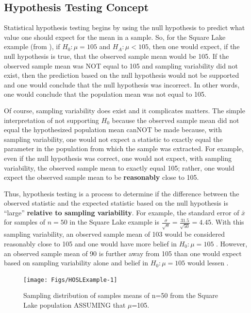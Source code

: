 \documentclass[10pt,openany]{book}\usepackage[]{graphicx}\usepackage[]{color}
\newenvironment{knitrout}{}{} %
\begin{document}
\subsection{Hypothesis Testing Concept}
\vspace{-6pt}
Statistical hypothesis testing begins by using the null hypothesis to predict what value one should expect for the mean in a sample. So, for the Square Lake example (from ), if $H_{0}:\mu=105$ and $H_{A}:\mu<105$, then one would expect, if the null hypothesis is true, that the observed sample mean would be 105. If the observed sample mean was NOT equal to 105 and sampling variability did not exist, then the prediction based on the null hypothesis would not be supported and one would conclude that the null hypothesis was incorrect. In other words, one would conclude that the population mean was not equal to 105.

Of course, sampling variability does exist and it complicates matters. The simple interpretation of not supporting $H_{0}$ because the observed sample mean did not equal the hypothesized population mean canNOT be made because, with sampling variability, one would not expect a statistic to exactly equal the parameter in the population from which the sample was extracted. For example, even if the null hypothesis was correct, one would not expect, with sampling variability, the observed sample mean to exactly equal 105; rather, one would expect the observed sample mean to be \textbf{reasonably} close to 105.

Thus, hypothesis testing is a process to determine if the difference between the observed statistic and the expected statistic based on the null hypothesis is ``large'' \textbf{relative to sampling variability}. For example, the standard error of $\bar{x}$ for samples of $n=50$ in the Square Lake example is $\frac{\sigma}{\sqrt{n}}=$$\frac{31.5}{\sqrt{50}}$$=4.45$. With this sampling variability, an observed sample mean of 103 would be considered reasonably close to 105 and one would have more belief in $H_{0}:\mu=105$ . However, an observed sample mean of 90 is further away from 105 than one would expect based on sampling variability alone and belief in $H_{0}:\mu=105$ would lessen .

\begin{knitrout}
\color{fgcolor}\begin{figure}[hbtp]

{\centering \texttt{[image: Figs/HOSLExample-1]} 

}

\caption[Sampling distribution of samples means of n=50 from the Square Lake population ASSUMING that $\mu$=105]{Sampling distribution of samples means of n=50 from the Square Lake population ASSUMING that $\mu$=105.}\label{fig:HOSLExample}
\end{figure}


\end{knitrout}
\end{document}
